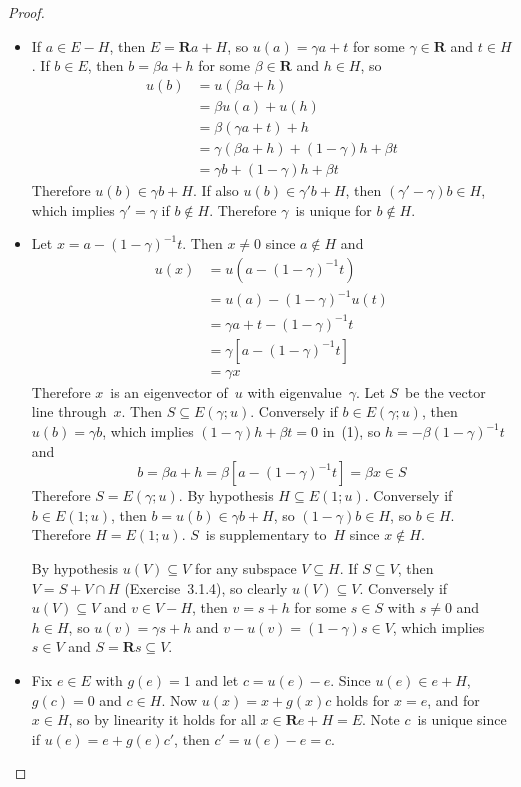 \documentclass[letterpaper,12pt]{article}
\newcommand{\R}{\mathbf{R}}
\newcommand{\sect}{\cap}
\theoremstyle{definition}
\theoremstyle{remark}
\begin{document}
\begin{proof}\
\begin{itemize}[itemsep=0pt]
\item If \(a\in E-H\), then \(E=\R a+H\), so \(u(a)=\gamma a+t\) for some \(\gamma\in\R\) and \(t\in H\). If \(b\in E\), then \(b=\beta a+h\) for some \(\beta\in\R\) and \(h\in H\), so
\begin{align*}
u(b)&=u(\beta a+h)\\
	&=\beta u(a)+u(h)\\
	&=\beta(\gamma a+t)+h\\
	&=\gamma(\beta a+h)+(1-\gamma)h+\beta t\\
	&=\gamma b+(1-\gamma)h+\beta t\tag{1}
\end{align*}
Therefore \(u(b)\in\gamma b+H\). If also \(u(b)\in\gamma'b+H\), then \((\gamma'-\gamma)b\in H\), which implies \(\gamma'=\gamma\) if \(b\not\in H\). Therefore \(\gamma\)~is unique for \(b\not\in H\).

\item Let \(x=a-(1-\gamma)^{-1}t\). Then \(x\ne 0\) since \(a\not\in H\) and
\begin{align*}
u(x)&=u(a-(1-\gamma)^{-1}t)\\
	&=u(a)-(1-\gamma)^{-1}u(t)\\
	&=\gamma a+t-(1-\gamma)^{-1}t\\
	&=\gamma[a-(1-\gamma)^{-1}t]\\
	&=\gamma x
\end{align*}
Therefore \(x\)~is an eigenvector of~\(u\) with eigenvalue~\(\gamma\). Let \(S\)~be the vector line through~\(x\). Then \(S\subseteq E(\gamma;u)\). Conversely if \(b\in E(\gamma;u)\), then \(u(b)=\gamma b\), which implies \((1-\gamma)h+\beta t=0\) in~(1), so \(h=-\beta(1-\gamma)^{-1}t\) and
\[b=\beta a+h=\beta[a-(1-\gamma)^{-1}t]=\beta x\in S\]
Therefore \(S=E(\gamma;u)\). By hypothesis \(H\subseteq E(1;u)\). Conversely if \(b\in E(1;u)\), then \(b=u(b)\in\gamma b+H\), so \((1-\gamma)b\in H\), so \(b\in H\). Therefore \(H=E(1;u)\). \(S\)~is supplementary to~\(H\) since \(x\not\in H\).

By hypothesis \(u(V)\subseteq V\) for any subspace \(V\subseteq H\). If \(S\subseteq V\), then \(V=S+V\sect H\) (Exercise~3.1.4), so clearly \(u(V)\subseteq V\). Conversely if \(u(V)\subseteq V\) and \(v\in V-H\), then \(v=s+h\) for some \(s\in S\) with \(s\ne 0\) and \(h\in H\), so \(u(v)=\gamma s+h\) and \(v-u(v)=(1-\gamma)s\in V\), which implies \(s\in V\) and \(S=\R s\subseteq V\).

\item Fix \(e\in E\) with \(g(e)=1\) and let \(c=u(e)-e\). Since \(u(e)\in e+H\), \(g(c)=0\) and \(c\in H\). Now \(u(x)=x+g(x)c\) holds for \(x=e\), and for \(x\in H\), so by linearity it holds for all \(x\in \R e+H=E\). Note \(c\)~is unique since if \(u(e)=e+g(e)c'\), then \(c'=u(e)-e=c\).


\end{itemize}
\end{proof}
\end{document}

